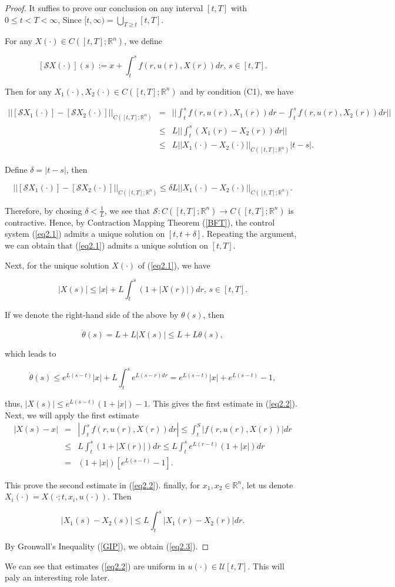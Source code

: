 \begin{proof}
It suffies to prove our conclusion on any interval $[t,T]$ with $0\leq 
t<T<\infty$, Since $[t,\infty)=\bigcup_{T\geq t}[t,T]$.

For any $X(\cdot)\in C([t,T];\mathbb{R}^n)$, we define

$$[\mathcal{S}X(\cdot)](s):=x+\int_{t}^{s}f(r,u(r),X(r))dr,\,s\in [t,T].$$

Then for any $X_1(\cdot),X_2(\cdot)\in C([t,T];\mathbb{R}^n)$ and by condition 
(C1), we have

\begin{eqnarray*}
||[\mathcal{S}X_1(\cdot)]-[\mathcal{S}X_2(\cdot)]||_{C([t,T];\mathbb{R}^n)}&=&||
 \int_{t}^{s}f(r,u(r),X_1(r))dr-\int_{t}^{s}f(r,u(r),X_2(r))dr||\\
&\leq& L||\int_{t}^{s} (X_1(r)-X_2(r)) dr||\\
&\leq& L||X_1(\cdot)-X_2(\cdot)||_{C([t,T];\mathbb{R}^n)}|t-s|.
\end{eqnarray*}

Define $\delta=|t-s|$, then

$$||[\mathcal{S}X_1(\cdot)]-[\mathcal{S}X_2(\cdot)]||_{C([t,T];\mathbb{R}^n)}\leq
 \delta L||X_1(\cdot)-X_2(\cdot)||_{C([t,T];\mathbb{R}^n)}.$$

Therefore, by chosing $\delta<\frac{1}{L}$, we see that $\mathcal{S}: 
C([t,T];\mathbb{R}^n)\rightarrow C([t,T];\mathbb{R}^n)$ is contractive. Hence, 
by Contraction Mapping Theorem (\ref{BFT}), the control system (\ref{eq2.1}) 
admits a unique solution on $[t,t+\delta]$. Repeating the argument, we can 
obtain that (\ref{eq2.1}) admits a unique solution on $[t,T]$.

Next, for the unique solution $X(\cdot)$ of (\ref{eq2.1}), we have

$$|X(s)|\leq |x|+L\int_{t}^{s}(1+|X(r)|)dr,\, s\in [t,T].$$

If we denote the right-hand side of the above by $\theta(s)$, then

$$\dot{\theta}(s)=L+L|X(s)|\leq L+L\theta(s),$$

which leads to 

$$\dot{\theta}(s)\leq 
e^{L(s-t)}|x|+L\int_{t}^{s}e^{L(s-r)dr}=e^{L(s-t)}|x|+e^{L(s-t)}-1,$$

thus, $|X(s)|\leq e^{L(s-t)}(1+|x|)-1.$ This gives the first estimate in 
(\ref{eq2.2}). Next, we will apply the first estimate
\begin{eqnarray*}
|X(s)-x| &=& |\int_{t}^{s}f(r,u(r),X(r))dr|\leq \int_{t}^{S}|f(r,u(r),X(r))|dr\\
&\leq& L\int_{t}^{s}(1+|X(r)|)dr\leq L\int_{t}^{s}e^{L(r-t)}(1+|x|)dr\\
&=& (1+|x|)[e^{L(s-t)}-1].
\end{eqnarray*}

This prove the second estimate in (\ref{eq2.2}). finally, for $x_1,x_2\in 
\mathbb{R}^n$, let us denote $X_i(\cdot)=X(\cdot;t,x_i,u(\cdot))$. Then

$$|X_1(s)-X_2(s)|\leq L\int_{t}^{s} |X_1(r)-X_2(r)|dr.$$

By Gronwall's Inequality (\ref{GIP}), we obtain (\ref{eq2.3}).
\end{proof}

We can see that estimates (\ref{eq2.2}) are uniform in $u(\cdot)\in 
\mathcal{U}[t,T]$. This will paly an interesting role later.